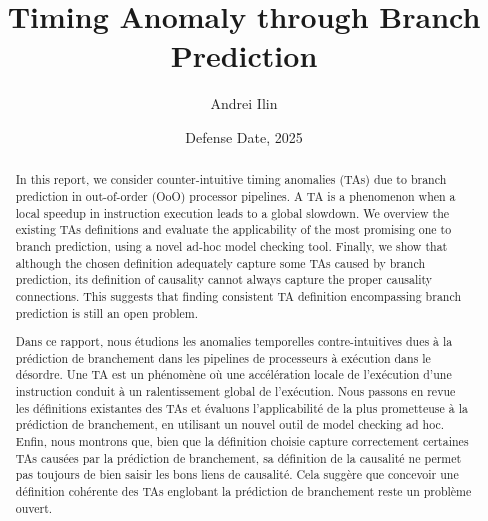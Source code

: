 \documentclass[12pt, a4paper]{memoir} %
\title{Timing Anomaly through Branch Prediction} %
\author{Andrei Ilin}
\date{Defense Date, 2025} %
\begin{document}
\frontmatter
\begin{titlingpage}
\maketitle
\end{titlingpage}

\setlength{\parskip}{-1pt plus 1pt}

\renewcommand{\abstracttextfont}{\normalfont}
\abstractintoc
\begin{abstract} 
In this report, we consider counter-intuitive timing anomalies (TAs) due to branch prediction in out-of-order (OoO) processor pipelines. A TA is a phenomenon when a local speedup in instruction execution leads to a global slowdown. We overview the existing TAs definitions and evaluate the applicability of the most promising one to branch prediction, using a novel ad-hoc model checking tool. Finally, we show that although the chosen definition adequately capture some TAs caused by branch prediction, its definition of causality cannot always capture the proper causality connections. This suggests that finding consistent TA definition encompassing branch prediction is still an open problem.

\end{abstract}
\abstractintoc



\renewcommand\abstractname{R\'esum\'e}
\begin{abstract} 
Dans ce rapport, nous \'etudions les anomalies temporelles contre-intuitives dues \`a la pr\'ediction de branchement dans les pipelines de processeurs \`a ex\'ecution dans le d\'esordre. Une TA est un ph\'enom\`ene o\`u une acc\'el\'eration locale de l'ex\'ecution d'une instruction conduit \`a un ralentissement global de l'ex\'ecution. Nous passons en revue les d\'efinitions existantes des TAs et \'evaluons l'applicabilit\'e de la plus prometteuse \`a la pr\'ediction de branchement, en utilisant un nouvel outil de model checking ad hoc. Enfin, nous montrons que, bien que la d\'efinition choisie capture correctement certaines TAs caus\'ees par la pr\'ediction de branchement, sa d\'efinition de la causalit\'e ne permet pas toujours de bien saisir les bons liens de causalit\'e. Cela sugg\`ere que concevoir une d\'efinition coh\'erente des TAs englobant la pr\'ediction de branchement reste un probl\`eme ouvert.
\end{abstract}
\end{document}
